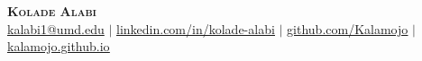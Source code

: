 \documentclass[letterpaper,11pt]{jake}
\begin{document}

\begin{center}
    \textbf{\Huge \scshape Kolade Alabi} \\ \vspace{1pt} 
    \small \href{mailto:kalabi1@umd.edu}{kalabi1@umd.edu} $|$
    \href{https://linkedin.com/in/kolade-alabi}{\underline{linkedin.com/in/kolade-alabi}} $|$
    \href{https://github.com/Kalamojo}{\underline{github.com/Kalamojo}} $|$
    \href{https://kalamojo.github.io}{\underline{kalamojo.github.io}}
\end{center}






\end{document}
